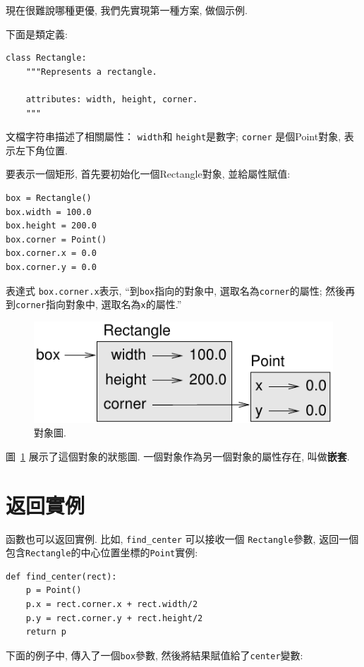 \documentclass[10pt]{book}
\begin{document}
現在很難說哪種更優, 我們先實現第一種方案, 做個示例. 

下面是類定義:

\begin{verbatim}
class Rectangle:
    """Represents a rectangle. 

    attributes: width, height, corner.
    """
\end{verbatim}
%
文檔字符串描述了相關屬性： {\tt width}和
{\tt height}是數字; {\tt corner} 是個Point對象, 表示左下角位置. 

要表示一個矩形, 首先要初始化一個Rectangle對象, 並給屬性賦值:

\begin{verbatim}
box = Rectangle()
box.width = 100.0
box.height = 200.0
box.corner = Point()
box.corner.x = 0.0
box.corner.y = 0.0
\end{verbatim}
%

表達式 {\tt box.corner.x}表示, 
``到{\tt box}指向的對象中, 選取名為{\tt corner}的屬性;
然後再到{\tt corner}指向對象中, 選取名為{\tt x}的屬性.''

\begin{figure}
\centerline
{\includegraphics[scale=0.8]{figs/rectangle.pdf}}
\caption{對象圖.}
\label{fig.rectangle}
\end{figure}


圖~\ref{fig.rectangle} 展示了這個對象的狀態圖. 
一個對象作為另一個對象的屬性存在, 叫做{\bf 嵌套}. 


\section{返回實例}

函數也可以返回實例. 比如, \verb"find_center" 可以接收一個
 {\tt Rectangle}參數, 返回一個包含{\tt Rectangle}的中心位置坐標的{\tt Point}實例:

\begin{verbatim}
def find_center(rect):
    p = Point()
    p.x = rect.corner.x + rect.width/2
    p.y = rect.corner.y + rect.height/2
    return p
\end{verbatim}
%
下面的例子中, 傳入了一個{\tt box}參數, 
然後將結果賦值給了{\tt center}變數:
\end{document}
